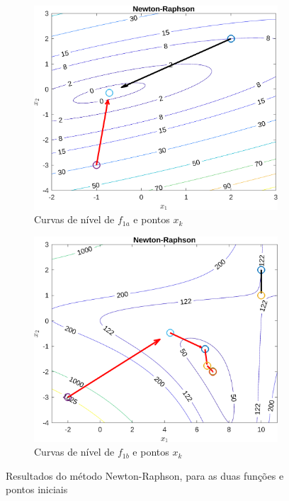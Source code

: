\documentclass[10pt, a4paper]{article}
\begin{document}
\begin{figure}[H]
      \centering
      \begin{subfigure}{0.45\textwidth}
            \includegraphics[width=\textwidth]{img01A_m05.png}
            \caption{Curvas de n\'ivel de $f_{1a}$ e pontos $x_{k}$}
            \label{fig:graf01A_m05}
      \end{subfigure}
      \begin{subfigure}{0.45\textwidth}
            \centering
            \includegraphics[width=\textwidth]{img01B_m05.png}
            \caption{Curvas de n\'ivel de $f_{1b}$ e pontos $x_{k}$}
            \label{fig:graf01B_m05}
      \end{subfigure}
      \caption{Resultados do m\'etodo Newton-Raphson, para as duas fun\c c\~oes e pontos iniciais}
      \label{fig:graf01_m05}
\end{figure}
\end{document}
